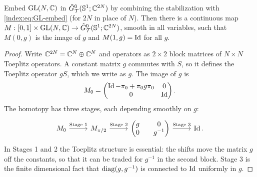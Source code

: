 \begin{proposition}\label{index:prop:deform-GL}
  Embed $\operatorname{GL}(N,\mathbb{C})$ in $\tilde G^0_{\mathcal T}(\mathbb{S}^1;\mathbb{C}^{2N})$ by
  combining the stabilization with \eqref{index:eq:GL-embed} (for $2N$ in
  place of $N$). Then there is a continuous map
  $M:[0,1]\times\operatorname{GL}(N,\mathbb{C})\to\tilde G^0_{\mathcal T}(\mathbb{S}^1;\mathbb{C}^{2N})$,
  smooth in all variables, such that $M(0,g)$ is the image of $g$ and
  $M(1,g)=\operatorname{Id}$ for all $g$.
\end{proposition}
\begin{proof}
  Write $\mathbb{C}^{2N}=\mathbb{C}^N\oplus\mathbb{C}^N$ and operators as $2\times2$ block matrices of
  $N\times N$ Toeplitz operators. A constant matrix $g$ commutes with $S$, so
  it defines the Toeplitz operator $gS$, which we write as $g$. The image of
  $g$ is
  \begin{equation*}
    M_0=\begin{pmatrix}\operatorname{Id}-\pi_0+\pi_0g\pi_0&0\\0&\operatorname{Id}\end{pmatrix}.
  \end{equation*}
  The homotopy has three stages, each depending smoothly on $g$:
  \begin{equation*}
    \begin{tikzcd}[column sep=2.6em]
      M_0 \arrow[r,"\text{Stage 1}"] &
      M_{\pi/2} \arrow[r,"\text{Stage 2}"] &
      \begin{pmatrix}g&0\\0&g^{-1}\end{pmatrix} \arrow[r,"\text{Stage 3}"] &
      \Id .
    \end{tikzcd}
  \end{equation*}
  In Stages 1 and 2 the Toeplitz structure is essential: the shifts move the
  matrix $g$ off the constants, so that it can be traded for $g^{-1}$ in the
  second block. Stage 3 is the finite dimensional fact that
  $\operatorname{diag}(g,g^{-1})$ is connected to $\operatorname{Id}$ uniformly in $g$.


\end{proof}
